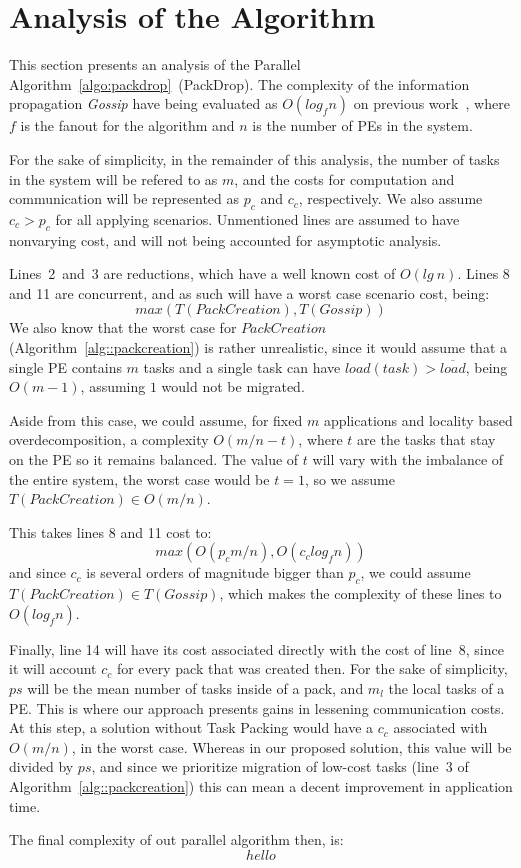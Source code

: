 \section{Analysis of the Algorithm}

This section presents an analysis of the Parallel Algorithm~\ref{algo:packdrop}~(PackDrop). 
The complexity of the information propagation \textit{Gossip} have being evaluated as $O(log_fn)$ on previous work~\cite{grapevine},
where $f$ is the fanout for the algorithm and $n$ is the number of PEs in the system.

For the sake of simplicity, in the remainder of this analysis, the number of tasks in the system
will be refered to as $m$, and the costs for computation and communication will be represented as $p_c$ and $c_c$, respectively.
We also assume $c_c > p_c$ for all applying scenarios.
Unmentioned lines are assumed to have nonvarying cost, and will not being accounted for asymptotic analysis.

Lines~2~and~3 are reductions, which have a well known cost of $O(lg\ n)$.
Lines 8 and 11 are concurrent, and as such will have a worst case scenario cost, being:
\begin{equation*}
  max(T(PackCreation),T(Gossip))
\end{equation*}
We also know that the worst case for $PackCreation$ (Algorithm~\ref{alg::packcreation}) is rather unrealistic, 
since it would assume that a single PE contains $m$ tasks and a single task can have $load(task) > \overline{load}$, being $O(m-1)$, assuming $1$ would not be migrated.

Aside from this case, we could assume, for fixed $m$ applications and locality based overdecomposition, a complexity $O(m/n -t)$, 
where $t$ are the tasks that stay on the PE so it remains balanced.
The value of $t$ will vary with the imbalance of the entire system, the worst case would be $t=1$, so we assume $T(Pack Creation)\in O(m/n)$.

This takes lines 8 and 11 cost to:
\begin{equation*}
 max(O(p_cm/n),O(c_clog_fn))
\end{equation*}
and since $c_c$ is several orders of magnitude bigger than $p_c$, we could assume $T(PackCreation)\in T(Gossip)$, which makes the 
complexity of these lines to $O(log_fn)$.

Finally, line 14 will have its cost associated directly with the cost of line~8, since it will account $c_c$ for every pack that was created then.
For the sake of simplicity, $ps$ will be the mean number of tasks inside of a pack, and $m_l$ the local tasks of a PE.
This is where our approach presents gains in lessening communication costs.
At this step, a solution without Task Packing would have a $c_c$ associated with $O(m/n)$, in the worst case.
Whereas in our proposed solution, this value will be divided by $ps$, and since we prioritize migration of low-cost tasks 
(line~3 of Algorithm~\ref{alg::packcreation}) this can mean a decent improvement in application time.

The final complexity of out parallel algorithm then, is:
\begin{equation}
 hello
 \label{eq:complexity}
\end{equation}
